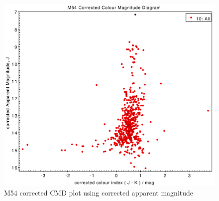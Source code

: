 \documentclass[12pt, twocolumn]{aastex62}
\begin{document}
	\begin{figure}
		\includegraphics[scale=0.34]{m54_cmd_corrected_apparent}
		\caption{M54 corrected CMD plot using corrected apparent magnitude}
		\label{fig: m54_cmd_corrected}
	\end{figure}
\end{document}
